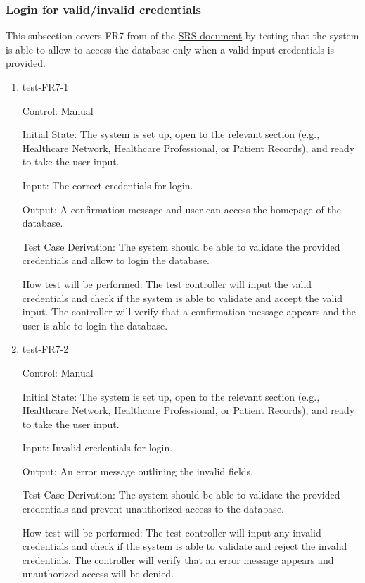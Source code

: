 \documentclass[12pt, titlepage]{article}
\begin{document}
\subsubsection{Login for valid/invalid credentials} \label{section:4.1.4}

This subsection covers FR7 from of the \href{https://github.com/Inreet-Kaur/capstone/blob/main/docs/SRS/SRS.pdf} {SRS document} by testing that the system is able to allow to access the database only when a valid input credentials is provided.

\begin{enumerate}

\item{test-FR7-1} \label{test-FR7-1}

Control: Manual

Initial State: The system is set up, open to the relevant section (e.g., Healthcare Network, Healthcare Professional, or Patient Records), and ready to take the user input.

Input: The correct credentials for login.

Output: A confirmation message and user can access the homepage of the database.

Test Case Derivation: The system should be able to validate the provided credentials and allow to login the database.

How test will be performed: The test controller will input the valid credentials and check if the system is able to validate and accept the valid input. The controller will verify that a confirmation message appears and the user is able to login the database.


\item{test-FR7-2} \label{test-FR7-2}

Control: Manual

Initial State: The system is set up, open to the relevant section (e.g., Healthcare Network, Healthcare Professional, or Patient Records), and ready to take the user input.

Input: Invalid credentials for login.

Output: An error message outlining the invalid fields.

Test Case Derivation: The system should be able to validate the provided credentials and prevent unauthorized access to the database.

How test will be performed: The test controller will input any invalid credentials and check if the system is able to validate and reject the invalid credentials. The controller will verify that an error message appears and unauthorized access will be denied.

\end{enumerate}
\end{document}
